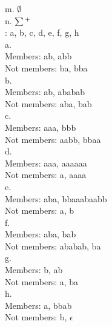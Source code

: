 \documentclass[12pt]{article}
\begin{document}
m. $ \emptyset $ \\

n. $ \sum \textsuperscript{+} $ \\


: a, b, c, d, e, f, g, h \\

\noindent
a. \\
Members: ab, abb \\
Not members: ba, bba \\

\noindent
b. \\
Members: ab, ababab \\
Not members: aba, bab \\

\noindent
c. \\
Members: aaa, bbb \\
Not members: aabb, bbaa \\

\noindent
d. \\
Members: aaa, aaaaaa  \\
Not members: a, aaaa
 \\

\noindent
e. \\
Members: aba, bbaaabaabb \\
Not members: a, b
 \\

\noindent
f. \\
Members: aba, bab \\
Not members: ababab, ba \\

\noindent
g. \\
Members: b, ab \\
Not members: a, ba \\

\noindent
h. \\
Members: a, bbab \\
Not members: b, $\epsilon$
\\


 \\
\end{document}
